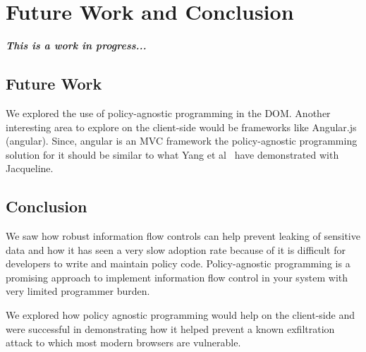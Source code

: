 \chapter{Future Work and Conclusion}
\textbf{\textit{This is a work in progress...}}
\section{Future Work}
We explored the use of policy-agnostic programming in the DOM. Another interesting
area to explore on the client-side would be frameworks like Angular.js (angular).
Since, angular is an MVC framework the policy-agnostic programming solution for it
should be similar to what Yang et al~\cite{Jacqueline} have demonstrated with Jacqueline.

\section{Conclusion}
We saw how robust information flow controls can help prevent leaking of sensitive
data and how it has seen a very slow adoption rate because of it is difficult
for developers to write and maintain policy code. Policy-agnostic programming is
a promising approach to implement information flow control in your system with
very limited programmer burden.

We explored how policy agnostic programming would help on the client-side and were
successful in demonstrating how it helped prevent a known exfiltration attack to
which most modern browsers are vulnerable.
